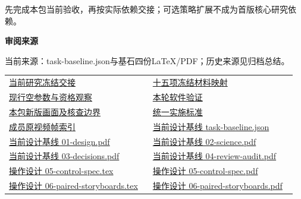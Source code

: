 \documentclass[11pt,a4paper]{article}
\newcommand{\reviewsubsection}[1]{\par\Needspace{4\baselineskip}\vspace{4pt}\begin{center}{\titlelatin\titlecjk\bfseries\fontsize{12}{18}\selectfont #1}\end{center}}
\begin{document}
先完成本包当前验收，再按实际依赖交接；可选策略扩展不成为首版核心研究依赖。


\begin{minipage}{\linewidth}
\reviewsubsection{3.4 审阅来源}
当前来源：task-\allowbreak{}baseline.json与基石四份LaTeX/\allowbreak{}PDF；历史来源见归档总结。


\begingroup\small\setlength{\tabcolsep}{4pt}\begin{tabular}{@{}p{0.48\linewidth}p{0.48\linewidth}@{}}
\href{file:///D:/Agent/srp/agent/tasks/U12-11/outputs/current-freeze.md}{当前研究冻结交接} & \href{file:///D:/Agent/srp/agent/tasks/U12-11/outputs/freeze-handoff.md}{十五项冻结材料映射}\\[4pt]
\href{file:///D:/Agent/srp/agent/tasks/U12-11/outputs/current-freeze.json}{现行空参数与资格观察} & \href{file:///D:/Agent/srp/agent/tasks/U12-11/evidence/verification.json}{本轮软件验证}\\[4pt]
\href{file:///D:/Agent/srp/agent/tasks/U12-11/outputs/current-implementation-evidence.md}{本包新版画面及核查边界} & \href{file:///D:/Agent/srp/agent/design/weather/2026-10-08_Storm\%E4\%B8\%8E\%E7\%BA\%AF\%E7\%B2\%92\%E5\%AD\%90\%E5\%8F\%8C\%E7\%8E\%AF\%E5\%AE\%9E\%E6\%96\%BD\%E6\%A0\%87\%E5\%87\%86.md}{统一实施标准}\\[4pt]
\href{file:///D:/Agent/srp/human/assets/previews/2026-10-08/member-storm-particle-rings/frame-index.json}{成员原视频帧索引} & \href{file:///D:/Agent/srp/agent/design/design-foundation-20261008/task-baseline.json}{当前设计基线 task-\allowbreak{}baseline.json}\\[4pt]
\href{file:///D:/Agent/srp/agent/design/design-foundation-20261008/01-design.pdf}{当前设计基线 01-\allowbreak{}design.pdf} & \href{file:///D:/Agent/srp/agent/design/design-foundation-20261008/02-science.pdf}{当前设计基线 02-\allowbreak{}science.pdf}\\[4pt]
\href{file:///D:/Agent/srp/agent/design/design-foundation-20261008/03-decisions.pdf}{当前设计基线 03-\allowbreak{}decisions.pdf} & \href{file:///D:/Agent/srp/agent/design/design-foundation-20261008/04-review-audit.pdf}{当前设计基线 04-\allowbreak{}review-\allowbreak{}audit.pdf}\\[4pt]
\href{file:///D:/Agent/srp/agent/design/design-foundation-20261008/05-control-spec.tex}{操作设计 05-\allowbreak{}control-\allowbreak{}spec.tex} & \href{file:///D:/Agent/srp/agent/design/design-foundation-20261008/05-control-spec.pdf}{操作设计 05-\allowbreak{}control-\allowbreak{}spec.pdf}\\[4pt]
\href{file:///D:/Agent/srp/agent/design/design-foundation-20261008/06-paired-storyboards.tex}{操作设计 06-\allowbreak{}paired-\allowbreak{}storyboards.tex} & \href{file:///D:/Agent/srp/agent/design/design-foundation-20261008/06-paired-storyboards.pdf}{操作设计 06-\allowbreak{}paired-\allowbreak{}storyboards.pdf}\\[4pt]

\end{tabular}
\end{minipage}
\end{document}
